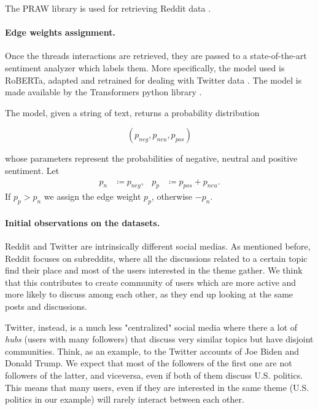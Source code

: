 The PRAW library is used for retrieving Reddit data \cite{praw}.

\paragraph{Edge weights assignment.}%
\label{par:assigning_edge_weights}

Once the threads interactions are retrieved, they are passed to a state-of-the-art
sentiment analyzer which labels them. More specifically, the model used is
RoBERTa, adapted and retrained for dealing with Twitter
data \cite{Barbieri2020}. The model is made available by the Transformers
python library \cite{wolf-etal-2020-transformers}.

The model, given a string of text, returns a probability distribution

\begin{equation*}
	(p_{neg}, p_{neu}, p_{pos})
\end{equation*}

whose parameters represent the probabilities of negative,
neutral and positive sentiment. Let
\begin{align}
	\label{eq:}
	p_n & \coloneqq p_{neg}, & p_p & \coloneqq p_{pos} + p_{neu}.
\end{align}
If $p_p > p_n $ we assign the edge weight $p_p$, otherwise $-p_n$.

%

\paragraph{Initial observations on the datasets.}
\label{sub:some_observations_on_the_datasets}
Reddit and Twitter are intrinsically different social medias. As mentioned
before, Reddit focuses on subreddits, where all the discussions related to a
certain topic find their place and most of the users interested in the
theme gather. We think that this contributes to create community of users which are more
active and more likely to discuss among each other, as they end up looking at the
same posts and discussions.

Twitter, instead, is a much less "centralized" social media where there a lot
of \emph{hubs} (users with many followers) that discuss very similar topics but
have disjoint communities.
Think, as an example, to the Twitter accounts of Joe Biden and Donald Trump. We expect that
most of the followers of the first one are not followers of the latter, and
viceversa, even if both of them discuss U.S. politics. This means that many
users, even if they are interested in the same theme (U.S. politics in our example)
will rarely interact between each other.

